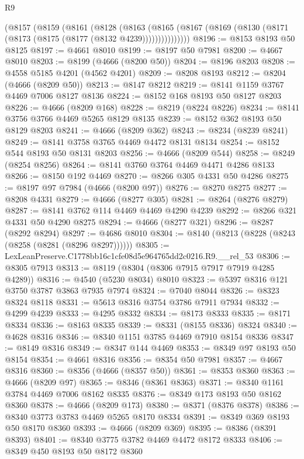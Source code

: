 \begin{lexlean}{R9}
\begin{coremodule}
      (@8157
        (@8159
          (@8161
            (@8128
              (@8163
                (@8165 (@8167 (@8169 (@8130 (@8171 (@8173 (@8175 (@8177 (@8132 @4239)))))))))))))))
@8196 := @8153 @8193 @50 @8125
@8197 := @4661 @8010
@8199 := @8197 @50 @7981
@8200 := @4667 @8010
@8203 := @8199 (@4666 (@8200 @50))
@8204 := @8196 @8203
@8208 := @4558 @5185 @4201 (@4562 @4201)
@8209 := @8208 @8193
@8212 := @8204 (@4666 (@8209 @50))
@8213 := @8147 @8212
@8219 := @8141 @1159 @3767 @4469 @7006 @8127 @8136
@8224 := @8152 @168 @8193 @50 @8127 @8203
@8226 := @4666 (@8209 @168)
@8228 := @8219 (@8224 @8226)
@8234 := @8141 @3756 @3766 @4469 @5265 @8129 @8135
@8239 := @8152 @362 @8193 @50 @8129 @8203
@8241 := @4666 (@8209 @362)
@8243 := @8234 (@8239 @8241)
@8249 := @8141 @3758 @3765 @4469 @4472 @8131 @8134
@8254 := @8152 @544 @8193 @50 @8131 @8203
@8256 := @4666 (@8209 @544)
@8258 := @8249 (@8254 @8256)
@8264 := @8141 @3760 @3764 @4469 @4471 @4286 @8133
@8266 := @8150 @192 @4469
@8270 := @8266 @305 @4331 @50 @4286
@8275 := @8197 @97 @7984 (@4666 (@8200 @97))
@8276 := @8270 @8275
@8277 := @8208 @4331
@8279 := @4666 (@8277 @305)
@8281 := @8264 (@8276 @8279)
@8287 := @8141 @3762 @114 @4469 @4469 @4290 @4239
@8292 := @8266 @321 @4331 @50 @4290 @8275
@8294 := @4666 (@8277 @321)
@8296 := @8287 (@8292 @8294)
@8297 := @4686 @8010
@8304 := @8140 (@8213 (@8228 (@8243 (@8258 (@8281 (@8296 @8297))))))
@8305 := LexLeanPreserve.C1778bb16c1cfe08d5e964765dd2c0216.R9.__rel_53
@8306 := @8305 @7913
@8313 := @8119 (@8304 (@8306 @7915 @7917 @7919 @4285 @4289))
@8316 := @4540 (@5230 @8034) @8010
@8323 := @5397 @8316 @121 @3750 @3787 @3863 @7935 @7974
@8324 := @7040 @8044
@8326 := @8323 @8324 @8118
@8331 := @5613 @8316 @3754 @3786 @7911 @7934
@8332 := @4299 @4239
@8333 := @4295 @8332
@8334 := @8173 @8333
@8335 := @8171 @8334
@8336 := @8163 @8335
@8339 := @8331 (@8155 @8336) @8324
@8340 := @4628 @8316
@8346 := @8340 @1151 @3785 @4469 @7910 @8154 @8336
@8347 := @8149 @8316
@8349 := @8347 @144 @4469
@8353 := @8349 @97 @8193 @50 @8154
@8354 := @4661 @8316
@8356 := @8354 @50 @7981
@8357 := @4667 @8316
@8360 := @8356 (@4666 (@8357 @50))
@8361 := @8353 @8360
@8363 := @4666 (@8209 @97)
@8365 := @8346 (@8361 @8363)
@8371 := @8340 @1161 @3784 @4469 @7006 @8162 @8335
@8376 := @8349 @173 @8193 @50 @8162 @8360
@8378 := @4666 (@8209 @173)
@8380 := @8371 (@8376 @8378)
@8386 := @8340 @3773 @3783 @4469 @5265 @8170 @8334
@8391 := @8349 @369 @8193 @50 @8170 @8360
@8393 := @4666 (@8209 @369)
@8395 := @8386 (@8391 @8393)
@8401 := @8340 @3775 @3782 @4469 @4472 @8172 @8333
@8406 := @8349 @450 @8193 @50 @8172 @8360

\end{coremodule}
\end{lexlean}
